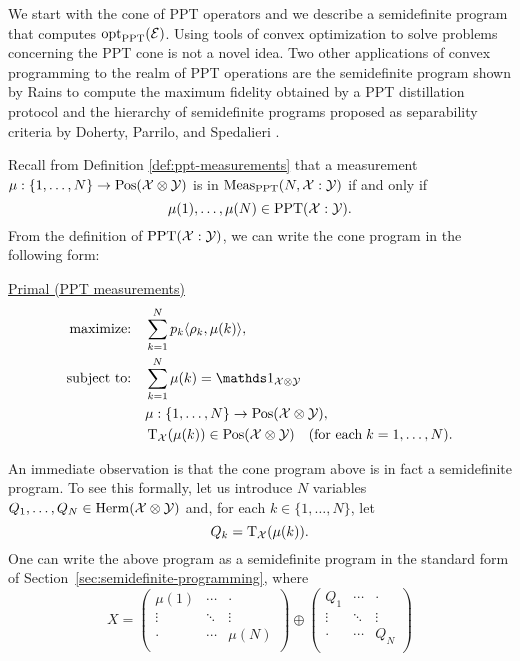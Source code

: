 We start with the cone of PPT operators and we describe a semidefinite program 
that computes $\operatorname{opt}_{\mathrm{PPT}}(\mathcal{E})$. Using tools of convex optimization to solve 
problems concerning the PPT cone is not a novel idea. 
Two other applications of convex programming to the realm of PPT operations 
are the semidefinite program shown by Rains to compute the maximum fidelity 
obtained by a PPT distillation protocol \cite{Rains01} and the hierarchy of 
semidefinite programs proposed as separability criteria by Doherty, Parrilo, and
Spedalieri \cite{Doherty02,Doherty04}.

Recall from Definition \ref{def:ppt-measurements} that a measurement 
$\mu : \{1, \ldots, N\} \rightarrow \mathrm{Pos}(\mathcal{X}\otimes\mathcal{Y})$ is in 
$\mathrm{Meas}_{\mathrm{PPT}}(N, \mathcal{X}:\mathcal{Y})$ if and only if
\begin{equation}
  \mu(1), \ldots, \mu(N) \in \mathrm{PPT}(\mathcal{X}:\mathcal{Y}).
\end{equation}
From the definition of $\mathrm{PPT}(\mathcal{X}:\mathcal{Y})$, we can write the cone program in
the following form:
\begin{center}
\underline{Primal (PPT measurements)}
\begin{equation}
  \label{eq:ppt-primal-problem}
  \begin{split}
    \text{maximize:} \quad & 
      \sum_{k=1}^{N} p_{k}\ip{\rho_{k}}{\mu(k)},\\
    \text{subject to:} \quad & \sum_{k=1}^{N} \mu(k) = \I_{\X\otimes\Y}\\
    & \mu : \{1,\ldots, N\}\rightarrow \Pos(\X\otimes\Y),\\
    & \pt_{\X}(\mu(k))\in\Pos(\X\otimes\Y) \quad(\text{for each}\;k = 1,\ldots,N).
  \end{split}
\end{equation}
\end{center}
An immediate observation is that the cone program above is in fact a semidefinite 
program. To see this formally, let us introduce $N$ variables 
$Q_{1},\ldots,Q_{N} \in \mathrm{Herm}(\mathcal{X}\otimes\mathcal{Y})$ and, for each $k \in \{1, \ldots, N\}$, let
\begin{equation}
  Q_{k} = \operatorname{T}_{\mathcal{X}}(\mu(k)).
\end{equation}
One can write the above program as a semidefinite program in the standard form of 
Section~\ref{sec:semidefinite-programming}, where
\begin{equation}
\label{eq:ppt-X}
X = \begin{pmatrix}
      \mu(1) & \cdots & \cdot\\
      \vdots & \ddots & \vdots\\
      \cdot & \cdots & \mu(N)\\
  \end{pmatrix}
  \oplus
  \begin{pmatrix}
      Q_1 & \cdots & \cdot\\
      \vdots & \ddots & \vdots\\
      \cdot & \cdots & Q_N\\
  \end{pmatrix}
\end{equation}
